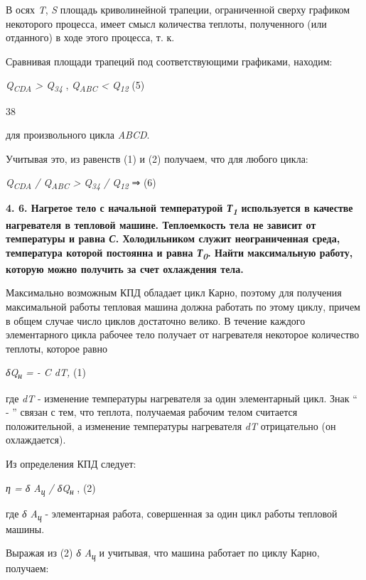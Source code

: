 В осях \emph{T}, \emph{S} площадь криволинейной трапеции, ограниченной
сверху графиком некоторого процесса, имеет смысл количества теплоты,
полученного (или отданного) в ходе этого процесса, т. к.


Сравнивая площади трапеций под соответствующими графиками, находим:

\emph{Q\textsubscript{CDA} \textgreater{} Q\textsubscript{34}} ,
\emph{Q\textsubscript{ABC} \textless{} Q\textsubscript{12}} (5)

38

для произвольного цикла \emph{ABCD}.

Учитывая это, из равенств (1) и (2) получаем, что для любого цикла:

\emph{Q\textsubscript{CDA} / Q\textsubscript{ABC} \textgreater{}
Q\textsubscript{34} / Q\textsubscript{12}} ⇒
(6)

\textbf{4. 6. Нагретое тело с начальной температурой
\emph{Т\textsubscript{1}} используется в качестве нагревателя в тепловой
машине. Теплоемкость тела не зависит от температуры и равна \emph{С}.
Холодильником служит неограниченная среда, температура которой постоянна
и равна \emph{Т\textsubscript{0}}. Найти максимальную работу, которую
можно получить за счет охлаждения тела.}

\solving{}

Максимально возможным КПД обладает цикл Карно, поэтому для получения
максимальной работы тепловая машина должна работать по этому циклу,
причем в общем случае число циклов достаточно велико. В течение каждого
элементарного цикла рабочее тело получает от нагревателя некоторое
количество теплоты, которое равно

\emph{δQ\textsubscript{н} = - C dT,} (1)

где \emph{dT} - изменение температуры нагревателя за один элементарный
цикл. Знак `` - '' связан с тем, что теплота, получаемая рабочим телом
считается положительной, а изменение температуры нагревателя \emph{dT}
отрицательно (он охлаждается).

Из определения КПД следует:

\emph{η = δ A\textsubscript{ц} / δQ\textsubscript{н}} , (2)

где \emph{δ A\textsubscript{ц}} - элементарная работа, совершенная за
один цикл работы тепловой машины.

Выражая из (2) \emph{δ A\textsubscript{ц}} и учитывая, что машина
работает по циклу Карно, получаем:

